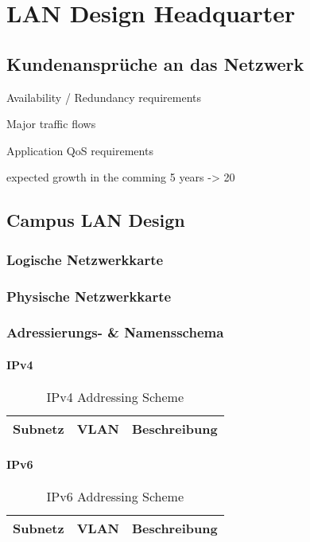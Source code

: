 \section{LAN Design Headquarter}

\subsection{Kundenansprüche an das Netzwerk}

Availability / Redundancy requirements

Major traffic flows

Application QoS requirements

expected growth in the comming 5 years -> 20%


\subsection{Campus LAN Design}

\subsubsection{Logische Netzwerkkarte}
\subsubsection{Physische Netzwerkkarte}

\subsubsection{Adressierungs- \& Namensschema}
\paragraph{IPv4} 
\begin{table}[h]
	\centering
	\begin{tabu} to \linewidth {l l l}
		\toprule 
		Subnetz & VLAN & Beschreibung \\
		\midrule
		
		\bottomrule 
	\end{tabu} 
	\caption{IPv4 Addressing Scheme}
\end{table}

\paragraph{IPv6}
\begin{table}[h]
	\centering
	\begin{tabu} to \linewidth {l l l}
		\toprule 
		Subnetz & VLAN & Beschreibung \\
		\midrule
	
		\bottomrule 
	\end{tabu} 
	\caption{IPv6 Addressing Scheme}
\end{table}


